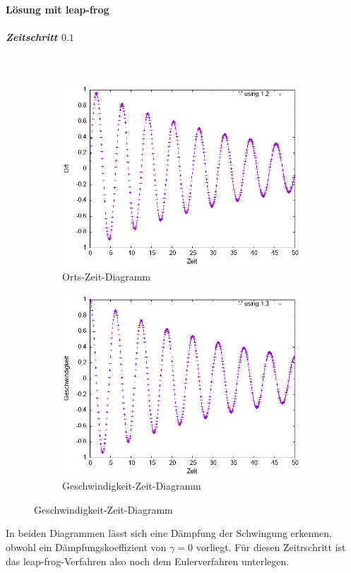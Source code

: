\documentclass[
    oneside,
    ngerman,
    footinclude=false,
    captions=tableheading,
    DIV=12
]{scrartcl}
\begin{document}
        \paragraph*{Lösung mit leap-frog}
            \subparagraph*{Zeitschritt $0.1$}\,
            \begin{figure}[H]
                \centering
                \begin{subfigure}[b]{0.45\textwidth}
                    \centering
                    \includegraphics[width=\textwidth]{Bilddateien/LLA1(a)-01-0-x.png}
                    \caption{Orts-Zeit-Diagramm}
                    \label{fig:LLA1(a)-01-0-x}
                \end{subfigure}
                \hfill
                \begin{subfigure}[b]{0.45\textwidth}
                    \centering
                    \includegraphics[width=\textwidth]{Bilddateien/LLA1(a)-01-0-v.png}
                    \caption{Geschwindigkeit-Zeit-Diagramm}
                    \label{fig:LLA1(a)-01-0-v}
                \end{subfigure}
            \end{figure}
            In beiden Diagrammen lässt sich eine Dämpfung der Schwingung erkennen, obwohl ein Dämpfungskoeffizient von $\gamma=0$ vorliegt. Für diesen Zeitrschritt ist das leap-frog-Verfahren also noch dem Eulerverfahren unterlegen.
        
\end{document}

